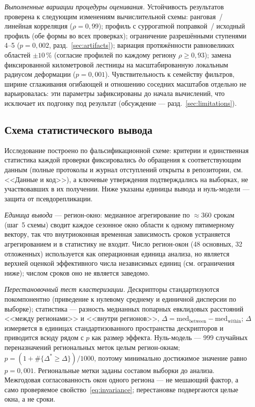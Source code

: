 \documentclass[11pt,a4paper]{article}
\begin{document}
\emph{Выполненные вариации процедуры оценивания.} Устойчивость результатов проверена к следующим изменениям вычислительной схемы: ранговая~/ линейная корреляция ($\rho=0{,}99$); профиль с суррогатной поправкой~/ исходный профиль (обе формы во всех проверках); ограничение разрешёнными ступенями 4--5 ($p=0{,}002$, разд.~\ref{sec:artifacts}); вариация протяжённости равновеликих областей $\pm10\,\%$ (согласие профилей по каждому региону $\rho\ge0{,}93$); замена фиксированной километровой лестницы на масштабированную локальным радиусом деформации ($p=0{,}001$). Чувствительность к семейству фильтров, ширине сглаживания огибающей и отношению соседних масштабов отдельно не варьировалась: эти параметры зафиксированы до начала вычислений, что исключает их подгонку под результат (обсуждение --- разд.~\ref{sec:limitations}).

\subsection{Схема статистического вывода}
\label{sec:inference}

Исследование построено по фальсификационной схеме: критерии и единственная статистика каждой проверки фиксировались \emph{до} обращения к соответствующим данным (полные протоколы и журнал отступлений открыты в репозитории, см. <<Данные и код>>), а ключевые утверждения подтверждались на выборках, не участвовавших в их получении. Ниже указаны единицы вывода и нуль-модели --- защита от псевдорепликации.

\emph{Единица вывода} --- регион-окно: медианное агрегирование по $\approx$360 срокам (шаг~5 схемы) сводит каждое сезонное окно области к одному пятимерному вектору, так что внутриоконная временная зависимость сроков устраняется агрегированием и в статистику не входит. Число регион-окон (48 основных, 32 отложенных) используется как операционная единица анализа, но является верхней оценкой эффективного числа независимых единиц (см. ограничения ниже); числом сроков оно не является заведомо.

\emph{Перестановочный тест кластеризации.} Дескрипторы стандартизуются покомпонентно (приведение к нулевому среднему и единичной дисперсии по выборке); статистика --- разность медианных попарных евклидовых расстояний <<между регионами>> и <<внутри регионов>>, $\Delta=\mathrm{med}_{\mathrm{between}}-\mathrm{med}_{\mathrm{within}}$; $\Delta$ измеряется в единицах стандартизованного пространства дескрипторов и приводится всюду рядом с $p$ как размер эффекта. Нуль-модель --- 999 случайных переназначений региональных меток целым регион-окнам; $p=(1+\#\{\Delta^\ast\ge\Delta\})/1000$, поэтому минимально достижимое значение равно $p=0{,}001$. Региональные метки заданы составом выборки до анализа. Межгодовая согласованность окон одного региона --- не мешающий фактор, а само проверяемое свойство~\eqref{eq:invariance}; перестановке подвергаются целые окна, а не сроки.
\end{document}
